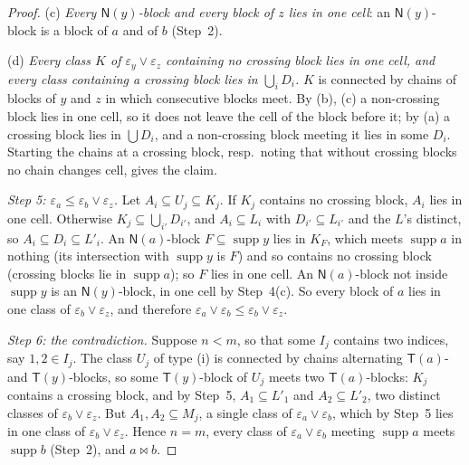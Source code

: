 \documentclass[11pt]{amsart}
\theoremstyle{definition}
\newcommand{\supp}{\operatorname{supp}}
\newcommand{\T}{\mathsf{T}}
\newcommand{\N}{\mathsf{N}}
\newcommand{\mt}{\bowtie}   %
\begin{document}
\begin{proof}
(c) \emph{Every $\N(y)$-block and every block of $z$ lies in one cell}: an $\N(y)$-block is a block of $a$ and of $b$ (Step~2).

(d) \emph{Every class $K$ of $\varepsilon_y\vee\varepsilon_z$ containing no crossing block lies in one cell, and every class containing a crossing block lies in $\bigcup_iD_i$.} $K$ is connected by chains of blocks of $y$ and $z$ in which consecutive blocks meet. By (b), (c) a non-crossing block lies in one cell, so it does not leave the cell of the block before it; by (a) a crossing block lies in $\bigcup D_i$, and a non-crossing block meeting it lies in some $D_i$. Starting the chains at a crossing block, resp.\ noting that without crossing blocks no chain changes cell, gives the claim.

\smallskip\emph{Step 5: $\varepsilon_a\le\varepsilon_b\vee\varepsilon_z$.} Let $A_i\subseteq U_j\subseteq K_j$. If $K_j$ contains no crossing block, $A_i$ lies in one cell. Otherwise $K_j\subseteq\bigcup_{i'}D_{i'}$, and $A_i\subseteq L_i$ with $D_{i'}\subseteq L_{i'}$ and the $L$'s distinct, so $A_i\subseteq D_i\subseteq L'_i$. An $\N(a)$-block $F\subseteq\supp y$ lies in $K_F$, which meets $\supp a$ in nothing (its intersection with $\supp y$ is $F$) and so contains no crossing block (crossing blocks lie in $\supp a$); so $F$ lies in one cell. An $\N(a)$-block not inside $\supp y$ is an $\N(y)$-block, in one cell by Step~4(c). So every block of $a$ lies in one class of $\varepsilon_b\vee\varepsilon_z$, and therefore $\varepsilon_a\vee\varepsilon_b\le\varepsilon_b\vee\varepsilon_z$.

\smallskip\emph{Step 6: the contradiction.} Suppose $n<m$, so that some $I_j$ contains two indices, say $1,2\in I_j$. The class $U_j$ of type (i) is connected by chains alternating $\T(a)$- and $\T(y)$-blocks, so some $\T(y)$-block of $U_j$ meets two $\T(a)$-blocks: $K_j$ contains a crossing block, and by Step~5, $A_1\subseteq L'_1$ and $A_2\subseteq L'_2$, two distinct classes of $\varepsilon_b\vee\varepsilon_z$. But $A_1,A_2\subseteq M_j$, a single class of $\varepsilon_a\vee\varepsilon_b$, which by Step~5 lies in one class of $\varepsilon_b\vee\varepsilon_z$. Hence $n=m$, every class of $\varepsilon_a\vee\varepsilon_b$ meeting $\supp a$ meets $\supp b$ (Step~2), and $a\mt b$.
\end{proof}
\end{document}
